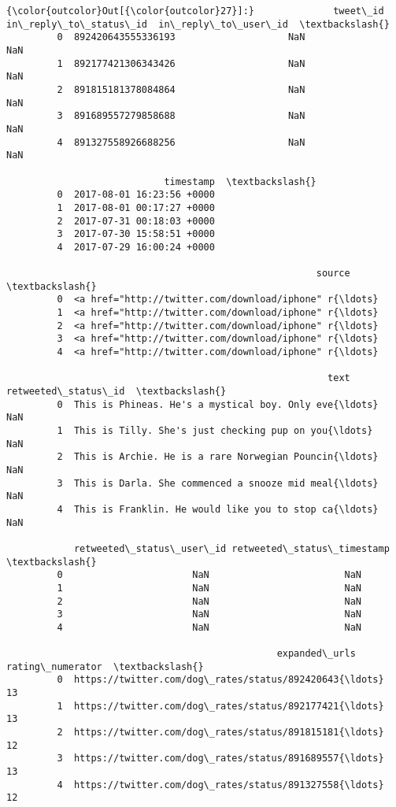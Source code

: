 \documentclass[11pt]{article}
\begin{document}
\begin{Verbatim}[commandchars=\\\{\}]
{\color{outcolor}Out[{\color{outcolor}27}]:}              tweet\_id  in\_reply\_to\_status\_id  in\_reply\_to\_user\_id  \textbackslash{}
         0  892420643555336193                    NaN                  NaN   
         1  892177421306343426                    NaN                  NaN   
         2  891815181378084864                    NaN                  NaN   
         3  891689557279858688                    NaN                  NaN   
         4  891327558926688256                    NaN                  NaN   
         
                            timestamp  \textbackslash{}
         0  2017-08-01 16:23:56 +0000   
         1  2017-08-01 00:17:27 +0000   
         2  2017-07-31 00:18:03 +0000   
         3  2017-07-30 15:58:51 +0000   
         4  2017-07-29 16:00:24 +0000   
         
                                                       source  \textbackslash{}
         0  <a href="http://twitter.com/download/iphone" r{\ldots}   
         1  <a href="http://twitter.com/download/iphone" r{\ldots}   
         2  <a href="http://twitter.com/download/iphone" r{\ldots}   
         3  <a href="http://twitter.com/download/iphone" r{\ldots}   
         4  <a href="http://twitter.com/download/iphone" r{\ldots}   
         
                                                         text  retweeted\_status\_id  \textbackslash{}
         0  This is Phineas. He's a mystical boy. Only eve{\ldots}                  NaN   
         1  This is Tilly. She's just checking pup on you{\ldots}                  NaN   
         2  This is Archie. He is a rare Norwegian Pouncin{\ldots}                  NaN   
         3  This is Darla. She commenced a snooze mid meal{\ldots}                  NaN   
         4  This is Franklin. He would like you to stop ca{\ldots}                  NaN   
         
            retweeted\_status\_user\_id retweeted\_status\_timestamp  \textbackslash{}
         0                       NaN                        NaN   
         1                       NaN                        NaN   
         2                       NaN                        NaN   
         3                       NaN                        NaN   
         4                       NaN                        NaN   
         
                                                expanded\_urls  rating\_numerator  \textbackslash{}
         0  https://twitter.com/dog\_rates/status/892420643{\ldots}                13   
         1  https://twitter.com/dog\_rates/status/892177421{\ldots}                13   
         2  https://twitter.com/dog\_rates/status/891815181{\ldots}                12   
         3  https://twitter.com/dog\_rates/status/891689557{\ldots}                13   
         4  https://twitter.com/dog\_rates/status/891327558{\ldots}                12   
         

\end{Verbatim}
\end{document}
